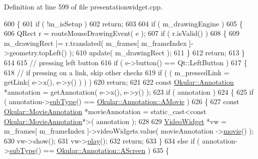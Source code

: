Definition at line 599 of file presentationwidget.\+cpp.


\begin{DoxyCode}
600 \{
601     \textcolor{keywordflow}{if} ( !m\_isSetup )
602         \textcolor{keywordflow}{return};
603 
604     \textcolor{keywordflow}{if} ( m\_drawingEngine )
605     \{
606         QRect r = routeMouseDrawingEvent( e );
607         \textcolor{keywordflow}{if} ( r.isValid() )
608         \{
609             m\_drawingRect |= r.translated( m\_frames[ m\_frameIndex ]->geometry.topLeft() );
610             update( m\_drawingRect );
611         \}
612         \textcolor{keywordflow}{return};
613     \}
614 
615     \textcolor{comment}{// pressing left button}
616     \textcolor{keywordflow}{if} ( e->button() == Qt::LeftButton )
617     \{
618         \textcolor{comment}{// if pressing on a link, skip other checks}
619         \textcolor{keywordflow}{if} ( ( m\_pressedLink = getLink( e->x(), e->y() ) ) )
620             \textcolor{keywordflow}{return};
621 
622         \textcolor{keyword}{const} \hyperlink{classOkular_1_1Annotation}{Okular::Annotation} *annotation = getAnnotation( e->x(), e->y() );
623         \textcolor{keywordflow}{if} ( annotation )
624         \{
625             \textcolor{keywordflow}{if} ( annotation->\hyperlink{classOkular_1_1Annotation_af9833449767eacd740f377e69a1fdd48}{subType}() == \hyperlink{classOkular_1_1Annotation_af71b46e37d5f850b97d5c4de3be9aac0a711a9d706a86b55f0799e944fb2750e6}{Okular::Annotation::AMovie} )
626             \{
627                 \textcolor{keyword}{const} \hyperlink{classOkular_1_1MovieAnnotation}{Okular::MovieAnnotation} *movieAnnotation = \textcolor{keyword}{static\_cast<}\textcolor{keyword}{const }
      \hyperlink{classOkular_1_1MovieAnnotation}{Okular::MovieAnnotation}*\textcolor{keyword}{>}( annotation );
628 
629                 \hyperlink{classVideoWidget}{VideoWidget} *vw = m\_frames[ m\_frameIndex ]->videoWidgets.value( movieAnnotation
      ->\hyperlink{classOkular_1_1MovieAnnotation_a1fc38e32a1704351c3e5916031be0267}{movie}() );
630                 vw->show();
631                 vw->\hyperlink{classVideoWidget_a00e08beaa6d8234f0cd3a6ef51e6709c}{play}();
632                 \textcolor{keywordflow}{return};
633             \}
634             \textcolor{keywordflow}{else} \textcolor{keywordflow}{if} ( annotation->\hyperlink{classOkular_1_1Annotation_af9833449767eacd740f377e69a1fdd48}{subType}() == 
      \hyperlink{classOkular_1_1Annotation_af71b46e37d5f850b97d5c4de3be9aac0a7cf8ba374ec139a8e2fb47a36182fa32}{Okular::Annotation::AScreen} )
635             \{

\end{DoxyCode}
